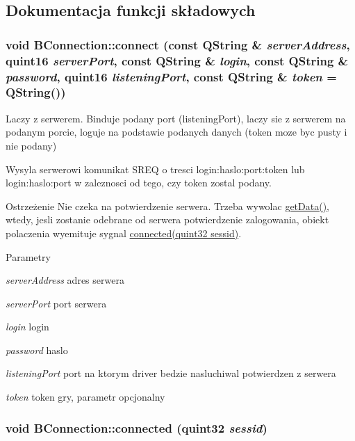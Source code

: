 \subsection{Dokumentacja funkcji składowych}
\hypertarget{class_b_connection_aac501a13f453169ed00bc3d4f8664040}{
\subsubsection[{connect}]{\setlength{\rightskip}{0pt plus 5cm}void BConnection::connect (const QString \& {\em serverAddress}, \/  quint16 {\em serverPort}, \/  const QString \& {\em login}, \/  const QString \& {\em password}, \/  quint16 {\em listeningPort}, \/  const QString \& {\em token} = {\ttfamily QString()})}}
\label{class_b_connection_aac501a13f453169ed00bc3d4f8664040}


Laczy z serwerem. Binduje podany port (listeningPort), laczy sie z serwerem na podanym porcie, loguje na podstawie podanych danych (token moze byc pusty i nie podany)

Wysyla serwerowi komunikat SREQ o tresci login:haslo:port:token lub login:haslo:port w zaleznosci od tego, czy token zostal podany.

\begin{DoxyWarning}{Ostrzeżenie}
Nie czeka na potwierdzenie serwera. Trzeba wywolac \hyperlink{class_b_connection_a68fb4ff5ee98e5228378d08a2fe2ae19}{getData()}, wtedy, jesli zostanie odebrane od serwera potwierdzenie zalogowania, obiekt polaczenia wyemituje sygnal \hyperlink{class_b_connection_a90dca3f0343427e31bb4544a8accf56d}{connected(quint32 sessid)}. 
\end{DoxyWarning}

\begin{DoxyParams}{Parametry}
\item[{\em serverAddress}]adres serwera \item[{\em serverPort}]port serwera \item[{\em login}]login \item[{\em password}]haslo \item[{\em listeningPort}]port na ktorym driver bedzie nasluchiwal potwierdzen z serwera \item[{\em token}]token gry, parametr opcjonalny \end{DoxyParams}
\hypertarget{class_b_connection_a90dca3f0343427e31bb4544a8accf56d}{
\subsubsection[{connected}]{\setlength{\rightskip}{0pt plus 5cm}void BConnection::connected (quint32 {\em sessid})}}
\label{class_b_connection_a90dca3f0343427e31bb4544a8accf56d}


